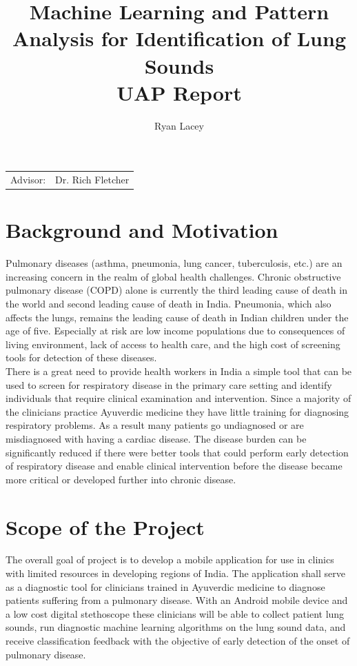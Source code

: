 \documentclass{article}
\title{Machine Learning and Pattern Analysis for Identification of Lung Sounds\\ UAP Report} %
\author{Ryan Lacey}
\date{}
\begin{document}
\maketitle %

\begin{center}
\begin{tabular}{l r}
Advisor: & Dr. Rich Fletcher \\
\end{tabular}
\end{center}

\section{Background and Motivation}

Pulmonary diseases (asthma, pneumonia, lung cancer, tuberculosis, etc.) are an increasing concern in the realm of global health challenges. Chronic obstructive pulmonary disease (COPD) alone is currently the third leading cause of death in the world and second leading cause of death in India. Pneumonia, which also affects the lungs, remains the leading cause of death in Indian children under the age of five. Especially at risk are low income populations due to consequences of living environment, lack of access to health care, and the high cost of screening tools for detection of these diseases.\\

There is a great need to provide health workers in India a simple tool that can be used to screen for respiratory disease in the primary care setting and identify individuals that require clinical examination and intervention. Since a majority of the clinicians practice Ayuverdic medicine they have little training for diagnosing respiratory problems. As a result many patients go undiagnosed or are misdiagnosed with having a cardiac disease. The disease burden can be significantly reduced if there were better tools that could perform early detection of respiratory disease and enable clinical intervention before the disease became more critical or developed further into chronic disease. \cite{Fletcher}\\

\section{Scope of the Project}

The overall goal of project is to develop a mobile application for use in clinics with limited resources in developing regions of India. The application shall serve as a diagnostic tool for clinicians trained in Ayuverdic medicine to diagnose patients suffering from a pulmonary disease. With an Android mobile device and a low cost digital stethoscope these clinicians will be able to collect patient lung sounds, run diagnostic machine learning algorithms on the lung sound data, and receive classification feedback with the objective of early detection of the onset of pulmonary disease. \\
\end{document}
